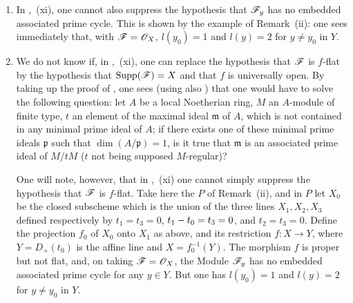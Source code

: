 \begin{remarks}[12.2.3]
\begin{enumerate}[label=(\roman*)]
  \item In ,~(xi), one cannot also suppress the hypothesis that $\mathscr{F}_y$ has no embedded associated prime cycle.
This is shown by the example of Remark~(ii): one sees immediately that, with $\mathscr{F}=\mathscr{O}_X$, $l(y_0)=1$ and $l(y)=2$ for $y\neq y_0$ in $Y$.

  \item We do not know if, in ,~(xi), one can replace the hypothesis that $\mathscr{F}$ is $f$-flat by the hypothesis that $\operatorname{Supp}(\mathscr{F})=X$ and that $f$ is universally open.
By taking up the proof of , one sees (using also ) that one would have to solve the following question: let $A$ be a local Noetherian ring, $M$ an $A$-module of finite type,
$t$ an element of the maximal ideal $\mathfrak{m}$ of $A$, which is not contained in any minimal prime ideal of $A$; if there exists one of these minimal prime ideals $\mathfrak{p}$ such that $\dim(A/\mathfrak{p})=1$, is it true that $\mathfrak{m}$ is an associated prime ideal of $M/tM$ ($t$ not being supposed $M$-regular)?

One will note, however, that in ,~(xi) one cannot simply suppress the hypothesis that $\mathscr{F}$ is $f$-flat. Take here the $P$ of Remark~(ii), and in $P$ let $X_0$ be the closed subscheme which is the union of the three lines $X_1,X_2,X_3$ defined respectively by $t_1=t_3=0$, $t_1- t_0=t_3=0$, and $t_2=t_3=0$. Define the projection $f_0$ of $X_0$ onto $X_1$ as above, and its restriction $f:X\to Y$, where $Y=D_+(t_0)$ is the affine line and $X=f_0^{-1}(Y)$. The morphism $f$ is proper but not flat, and, on taking $\mathscr{F}=\mathscr{O}_X$, the Module $\mathscr{F}_y$ has no embedded associated prime cycle for any $y\in Y$. But one has $l(y_0)=1$ and $l(y)=2$ for $y\neq y_0$ in $Y$.
\end{enumerate}
\end{remarks}

